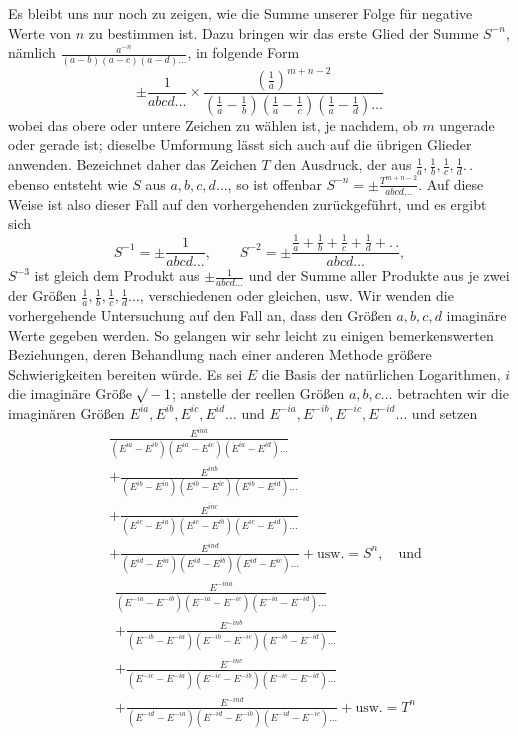 Es bleibt uns nur noch zu zeigen, wie die Summe unserer Folge für negative Werte von $n$ zu bestimmen ist. Dazu bringen wir das erste Glied der Summe $S^{-n}$, nämlich $\frac{a^{-n}}{(a-b)(a-c)(a-d)\ldots}$, in folgende Form
\[
\pm\frac1{abcd\ldots}\times\frac{(\frac1a)^{m+n-2}}{(\frac1a-\frac1b)(\frac1a-\frac1c)(\frac1a-\frac1d)\ldots}
\]
wobei das obere oder untere Zeichen zu wählen ist, je nachdem, ob $m$ ungerade oder gerade ist; dieselbe Umformung lässt sich auch auf die übrigen Glieder anwenden. Bezeichnet daher das Zeichen $T$ den Ausdruck, der aus $\frac1a,\frac1b,\frac1c,\frac1d.\,.$ ebenso entsteht wie $S$ aus $a,b,c,d\ldots$, so ist offenbar $S^{-n}=\pm\frac{T^{m+n-2}}{abcd\ldots}$. Auf diese Weise ist also dieser Fall auf den vorhergehenden zurückgeführt, und es ergibt sich
\[
S^{-1}=\pm\frac1{abcd\ldots},\qquad S^{-2}=\pm\frac{\frac1a+\frac1b+\frac1c+\frac1d+.\,.}{abcd\ldots},
\]
$S^{-3}$ ist gleich dem Produkt aus $\pm\frac1{abcd\ldots}$ und der Summe aller Produkte aus je zwei der Größen $\frac1a,\frac1b,\frac1c,\frac1d\ldots$, verschiedenen oder gleichen, usw.
Wir wenden die vorhergehende Untersuchung auf den Fall an, dass den Größen $a,b,c,d$ imaginäre Werte gegeben werden. So gelangen wir sehr leicht zu einigen bemerkenswerten Beziehungen, deren Behandlung nach einer anderen Methode größere Schwierigkeiten bereiten würde. Es sei $E$ die Basis der natürlichen Logarithmen, $i$ die imaginäre Größe $\mathord{{}^{}\!\surd}-1$; anstelle der reellen Größen $a,b,c\ldots$ betrachten wir die imaginären Größen $E^{ia},E^{ib},E^{ic},E^{id}\ldots$ und $E^{-ia},E^{-ib},E^{-ic},E^{-id}\ldots$ und setzen
\[
\begin{aligned}
&\frac{E^{ina}}{(E^{ia}-E^{ib})(E^{ia}-E^{ic})(E^{ia}-E^{id})\ldots}\\
&+\frac{E^{inb}}{(E^{ib}-E^{ia})(E^{ib}-E^{ic})(E^{ib}-E^{id})\ldots}\\
&+\frac{E^{inc}}{(E^{ic}-E^{ia})(E^{ic}-E^{ib})(E^{ic}-E^{id})\ldots}\\
&+\frac{E^{ind}}{(E^{id}-E^{ia})(E^{id}-E^{ib})(E^{id}-E^{ic})\ldots}+\text{usw.}=S^n,\quad\text{und}
\end{aligned}
\]
\[
\begin{aligned}
&\frac{E^{-ina}}{(E^{-ia}-E^{-ib})(E^{-ia}-E^{-ic})(E^{-ia}-E^{-id})\ldots}\\
&+\frac{E^{-inb}}{(E^{-ib}-E^{-ia})(E^{-ib}-E^{-ic})(E^{-ib}-E^{-id})\ldots}\\
&+\frac{E^{-inc}}{(E^{-ic}-E^{-ia})(E^{-ic}-E^{-ib})(E^{-ic}-E^{-id})\ldots}\\
&+\frac{E^{-ind}}{(E^{-id}-E^{-ia})(E^{-id}-E^{-ib})(E^{-id}-E^{-ic})\ldots}+\text{usw.}=T^n
\end{aligned}
\]
